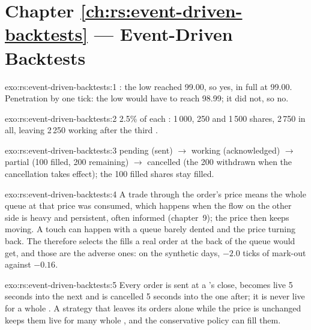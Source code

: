 \section*{Chapter \ref{ch:rs:event-driven-backtests} --- Event-Driven Backtests}

\begin{solution}{exo:rs:event-driven-backtests:1}
: the low reached 99.00, so yes, in full at 99.00. Penetration by one tick: the low would have to reach 98.99; it did not, so no.
\end{solution}

\begin{solution}{exo:rs:event-driven-backtests:2}
2.5\% of each : 1\,000, 250 and 1\,500 shares, 2\,750 in all, leaving 2\,250 working after the third .
\end{solution}

\begin{solution}{exo:rs:event-driven-backtests:3}
pending (sent) $\to$ working (acknowledged) $\to$ partial (100 filled, 200 remaining) $\to$ cancelled (the 200 withdrawn when the cancellation takes effect);
the 100 filled shares stay filled.
\end{solution}

\begin{solution}{exo:rs:event-driven-backtests:4}
A trade through the order's price means the whole queue at that price was consumed, which happens when the flow on the other side is heavy and
persistent, often informed (chapter~9); the price then keeps moving. A touch can happen with a queue barely dented and the price turning back. The
 therefore selects the fills a real order at the back of the queue would get, and those are the adverse ones: on the synthetic days,
$-2.0$ ticks of mark-out against $-0.16$.
\end{solution}

\begin{solution}{exo:rs:event-driven-backtests:5}
Every order is sent at a 's close, becomes live 5 seconds into the next  and is cancelled 5 seconds into the one after; it is never live for a whole
. A strategy that leaves its orders alone while the price is unchanged keeps them live for many whole , and the conservative policy can fill them.
\end{solution}

